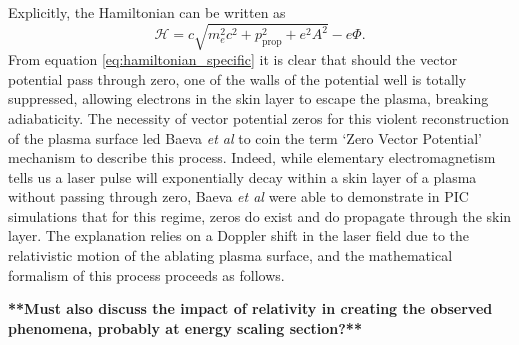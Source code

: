 Explicitly, the Hamiltonian can be written as
\begin{equation}\label{eq:hamiltonian_specific}
	\mathcal{H} = c\sqrt{m^2_ec^2 + p^2_\mathrm{prop} + e^2A^2} - e\Phi.
\end{equation}
From equation \ref{eq:hamiltonian_specific} it is clear that should the vector potential pass through zero, one of the walls of the potential well is totally suppressed, allowing electrons in the skin layer to escape the plasma, breaking adiabaticity. The necessity of vector potential zeros for this violent reconstruction of the plasma surface led Baeva \textit{et al} \cite{baevaZeroVectorPotential2011} to coin the term `Zero Vector Potential' mechanism to describe this process. Indeed, while elementary electromagnetism tells us a laser pulse will exponentially decay within a skin layer of a plasma without passing through zero, Baeva \textit{et al} \cite{baevaZeroVectorPotential2011} were able to demonstrate in \ac{PIC} simulations that for this regime, zeros do exist and do propagate through the skin layer. The explanation relies on a Doppler shift in the laser field due to the relativistic motion of the ablating plasma surface, and the mathematical formalism of this process proceeds as follows.

\textbf{**Must also discuss the impact of relativity in creating the observed phenomena, probably at energy scaling section?**}

